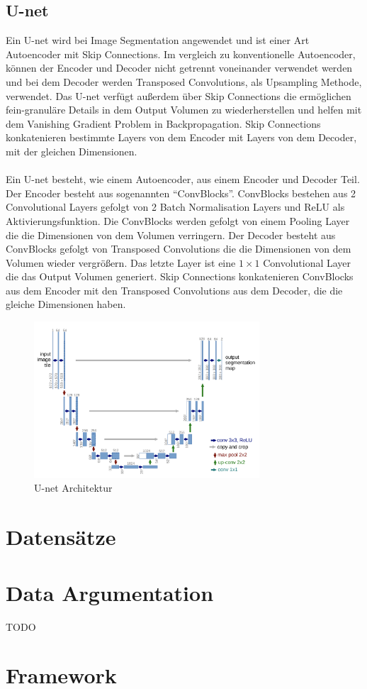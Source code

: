 \subsection{U-net}
Ein U-net wird bei Image Segmentation angewendet und ist einer Art Autoencoder mit Skip Connections. Im vergleich zu konventionelle Autoencoder, können
der Encoder und Decoder nicht getrennt voneinander verwendet werden und bei dem Decoder werden Transposed Convolutions, als Upsampling 
Methode, verwendet. Das U-net verfügt außerdem über Skip Connections die ermöglichen fein-granuläre Details in dem Output Volumen zu 
wiederherstellen und helfen mit dem Vanishing Gradient Problem in Backpropagation. Skip Connections konkatenieren bestimmte Layers von dem
Encoder mit Layers von dem Decoder, mit der gleichen Dimensionen.
\\
\\
Ein U-net besteht, wie einem Autoencoder, aus einem Encoder und Decoder Teil. Der Encoder besteht aus sogenannten ``ConvBlocks''. ConvBlocks
bestehen aus 2 Convolutional Layers gefolgt von 2 Batch Normalisation Layers und ReLU als Aktivierungsfunktion. Die ConvBlocks werden gefolgt
von einem Pooling Layer die die Dimensionen von dem Volumen verringern. Der Decoder besteht aus ConvBlocks gefolgt von Transposed Convolutions
die die Dimensionen von dem Volumen wieder vergrößern. Das letzte Layer ist eine $1 \times 1$ Convolutional Layer die das Output Volumen generiert.
Skip Connections konkatenieren ConvBlocks aus dem Encoder mit den Transposed Convolutions aus dem Decoder, die die gleiche Dimensionen haben.

\begin{figure}[H]
  \centering
  \includegraphics[width=0.75\textwidth]{resources/networks/unet.png}
  \caption{
    U-net Architektur
    \cite{ronneberger2015unet}
  }
  \label{image:unet}
\end{figure}


\section{Datensätze}
\section{Data Argumentation}
TODO
\section{Framework}